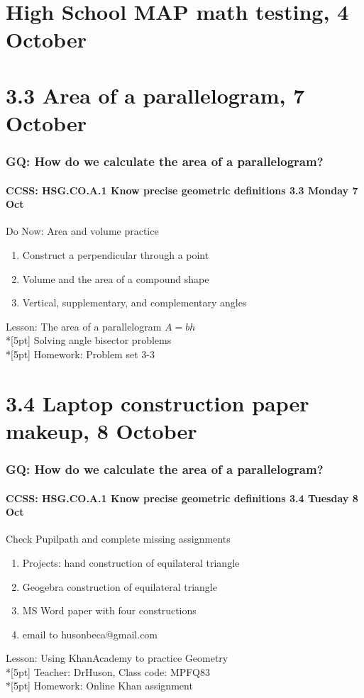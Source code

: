 \documentclass{beamer}
\begin{document}
  \section{High School MAP math testing, 4 October}

  \section{3.3 Area of a parallelogram, 7 October}
    \frame
    {
      \frametitle{GQ: How do we calculate the area of a parallelogram?}
      \framesubtitle{CCSS: HSG.CO.A.1 Know precise geometric definitions \hfill \alert{3.3 Monday 7 Oct}}

      \begin{block}{Do Now: Area and volume practice}
      \begin{enumerate}
        \item Construct a perpendicular through a point
        \item Volume and the area of a compound shape
        \item Vertical, supplementary, and complementary angles
      \end{enumerate}
      \end{block}
      Lesson: The area of a parallelogram $A=bh$\\*[5pt]
      Solving angle bisector problems\\*[5pt]
      Homework: Problem set 3-3
    }

  \section{3.4 Laptop construction paper makeup, 8 October}
    \frame
    {
      \frametitle{GQ: How do we calculate the area of a parallelogram?}
      \framesubtitle{CCSS: HSG.CO.A.1 Know precise geometric definitions \hfill \alert{3.4 Tuesday 8 Oct}}

      \begin{block}{Check Pupilpath and complete missing assignments}
      \begin{enumerate}
        \item Projects: hand construction of equilateral triangle
        \item Geogebra construction of equilateral triangle
        \item MS Word paper with four constructions
        \item email to husonbeca@gmail.com
      \end{enumerate}
      \end{block}
      Lesson: Using KhanAcademy to practice Geometry \\*[5pt]
      Teacher: DrHuson, Class code: MPFQ83\\*[5pt]
      Homework: Online Khan assignment
    }
\end{document}
